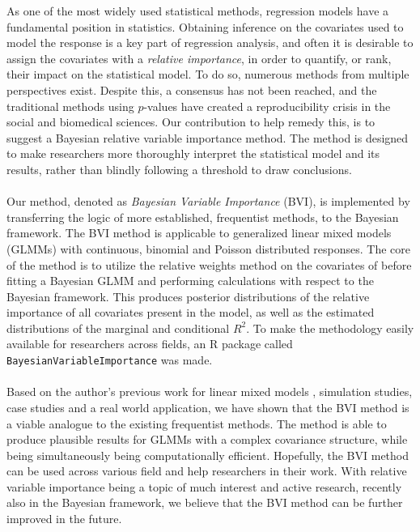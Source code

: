As one of the most widely used statistical methods, regression models have a fundamental position in statistics. Obtaining inference on the covariates used to model the response is a key part of regression analysis, and often it is desirable to assign the covariates with a \textit{relative importance}, in order to quantify, or rank, their impact on the statistical model. To do so, numerous methods from multiple perspectives exist. Despite this, a consensus has not been reached, and the traditional methods using $p$-values have created a reproducibility crisis in the social and biomedical sciences. Our contribution to help remedy this, is to suggest a Bayesian relative variable importance method. The method is designed to make researchers more thoroughly interpret the statistical model and its results, rather than blindly following a threshold to draw conclusions.
\\
\\
Our method, denoted as \textit{Bayesian Variable Importance} (BVI), is implemented by transferring the logic of more established, frequentist methods, to the Bayesian framework. The BVI method is applicable to generalized linear mixed models (GLMMs) with continuous, binomial and Poisson distributed responses. The core of the method is to utilize the relative weights method on the covariates of before fitting a Bayesian GLMM and performing calculations with respect to the Bayesian framework. This produces posterior distributions of the relative importance of all covariates present in the model, as well as the estimated distributions of the marginal and conditional $R^2$. To make the methodology easily available for researchers across fields, an R package called \texttt{BayesianVariableImportance} was made.
\\
\\
Based on the author's previous work for linear mixed models \citep{Arnstad:Relative_variable_importance_in_Bayesian_linear_mixed_models:2024}, simulation studies, case studies and a real world application, we have shown that the BVI method is a viable analogue to the existing frequentist methods. The method is able to produce plausible results for GLMMs with a complex covariance structure, while being simultaneously being computationally efficient. Hopefully, the BVI method can be used across various field and help researchers in their work. With relative variable importance being a topic of much interest and active research, recently also in the Bayesian framework, we believe that the BVI method can be further improved in the future.